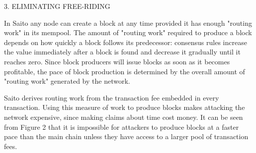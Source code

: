 \documentclass[11pt, oneside]{article}   	%
\begin{document}
\begin{multicols}{2}
3. ELIMINATING FREE-RIDING

In Saito any node can create a block at any time provided it has enough "routing work" in its mempool. The amount of "routing work" required to produce a block depends on how quickly a block follows its predecessor: consensus rules increase the value immediately after a block is found and decrease it gradually until it reaches zero. Since block producers will issue blocks as soon as it becomes profitable, the pace of block production is determined by the overall amount of "routing work" generated by the network.

{}

Saito derives routing work from the transaction fee embedded in every transaction. Using this measure of work to produce blocks makes attacking the network expensive, since making claims about time cost money. It can be seen from Figure 2 that it is impossible for attackers to produce blocks at a faster pace than the main chain unless they have access to a larger pool of transaction fees.



\end{multicols}
\end{document}
